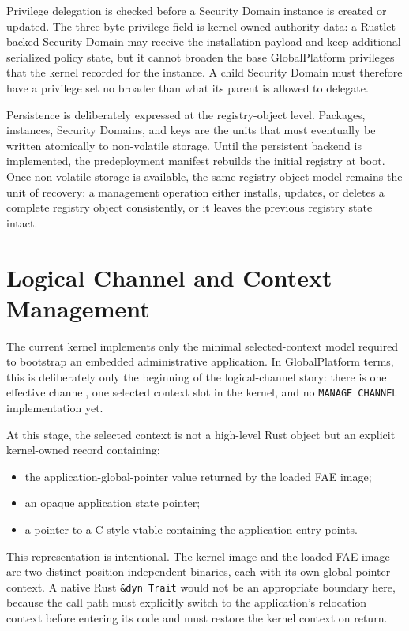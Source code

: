 Privilege delegation is checked before a Security Domain instance is created or
updated. The three-byte privilege field is kernel-owned authority data: a
Rustlet-backed Security Domain may receive the installation payload and keep
additional serialized policy state, but it cannot broaden the base
GlobalPlatform privileges that the kernel recorded for the instance. A child
Security Domain must therefore have a privilege set no broader than what its
parent is allowed to delegate.

Persistence is deliberately expressed at the registry-object level. Packages,
instances, Security Domains, and keys are the units that must eventually be
written atomically to non-volatile storage. Until the persistent backend is
implemented, the predeployment manifest rebuilds the initial registry at boot.
Once non-volatile storage is available, the same registry-object model remains
the unit of recovery: a management operation either installs, updates, or
deletes a complete registry object consistently, or it leaves the previous
registry state intact.

\section{Logical Channel and Context Management}
\label{sec:impl-channel}

The current kernel implements only the minimal selected-context model
required to bootstrap an embedded administrative application. In
GlobalPlatform terms, this is deliberately only the beginning of the
logical-channel story: there is one effective channel, one selected
context slot in the kernel, and no \texttt{MANAGE CHANNEL}
implementation yet.

At this stage, the selected context is not a high-level Rust object but
an explicit kernel-owned record containing:
\begin{itemize}
\item the application-global-pointer value returned by the loaded FAE
  image;
\item an opaque application state pointer;
\item a pointer to a C-style vtable containing the application entry
  points.
\end{itemize}

This representation is intentional. The kernel image and the loaded FAE
image are two distinct position-independent binaries, each with its own
global-pointer context. A native Rust \texttt{\&dyn Trait} would not be
an appropriate boundary here, because the call path must explicitly
switch to the application's relocation context before entering its code
and must restore the kernel context on return.

